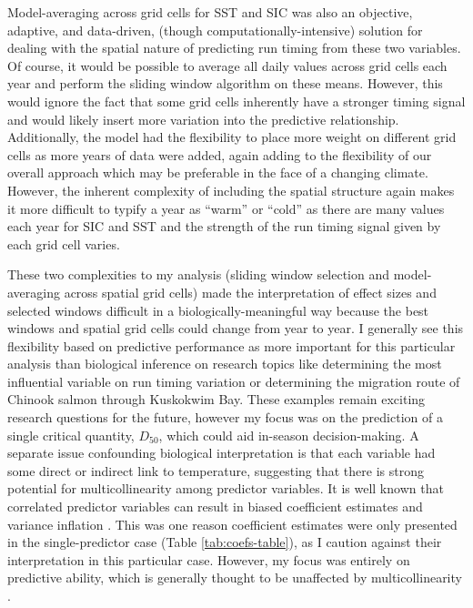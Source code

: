 \documentclass[12pt,]{book}
\theoremstyle{definition}
\theoremstyle{definition}
\theoremstyle{definition}
\theoremstyle{remark}
\begin{document}
Model-averaging across grid cells for SST and SIC was also an objective,
adaptive, and data-driven, (though computationally-intensive) solution
for dealing with the spatial nature of predicting run timing from these
two variables. Of course, it would be possible to average all daily
values across grid cells each year and perform the sliding window
algorithm on these means. However, this would ignore the fact that some
grid cells inherently have a stronger timing signal and would likely
insert more variation into the predictive relationship. Additionally,
the model had the flexibility to place more weight on different grid
cells as more years of data were added, again adding to the flexibility
of our overall approach which may be preferable in the face of a
changing climate. However, the inherent complexity of including the
spatial structure again makes it more difficult to typify a year as
``warm'' or ``cold'' as there are many values each year for SIC and SST
and the strength of the run timing signal given by each grid cell
varies.

These two complexities to my analysis (sliding window selection and
model-averaging across spatial grid cells) made the interpretation of
effect sizes and selected windows difficult in a biologically-meaningful
way because the best windows and spatial grid cells could change from
year to year. I generally see this flexibility based on predictive
performance as more important for this particular analysis than
biological inference on research topics like determining the most
influential variable on run timing variation or determining the
migration route of Chinook salmon through Kuskokwim Bay. These examples
remain exciting research questions for the future, however my focus was
on the prediction of a single critical quantity, \(D_{50}\), which could
aid in-season decision-making. A separate issue confounding biological
interpretation is that each variable had some direct or indirect link to
temperature, suggesting that there is strong potential for
multicollinearity among predictor variables. It is well known that
correlated predictor variables can result in biased coefficient
estimates and variance inflation \citep{neter-etal-1996}. This was one
reason coefficient estimates were only presented in the single-predictor
case (Table \ref{tab:coefs-table}), as I caution against their
interpretation in this particular case. However, my focus was entirely
on predictive ability, which is generally thought to be unaffected by
multicollinearity \citep{graham-2003}.
\end{document}
